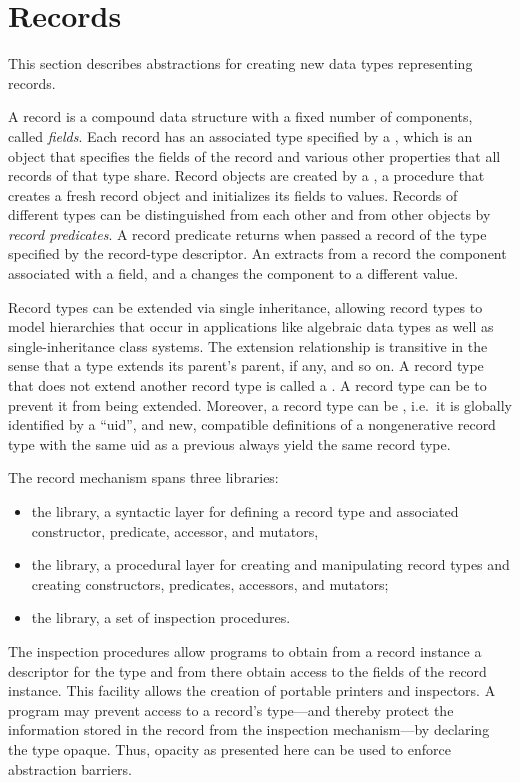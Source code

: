 \chapter{Records}
\label{recordschapter}
This section describes abstractions for creating new data types
representing records.

A record is a compound data structure with a fixed number of
components, called \textit{fields}.  Each record has
an associated type specified by a ,
which is an object that specifies the fields of the record and various
other properties that all records of that type share.  Record objects
are created by a , a procedure that
creates a fresh record object and initializes its fields to values.
Records of different types can be distinguished from each other and
from other objects by \textit{record predicates}. A record predicate
returns \schtrue{} when passed a record of the type specified by the
record-type descriptor.  An  extracts from a record
the component associated with a field, and a 
changes the component to a different value.

Record types can be extended via single inheritance, allowing record
types to model hierarchies that occur in applications like algebraic
data types as well as single-inheritance class systems.  The extension
relationship is transitive in the sense that a type extends its
parent's parent, if any, and so on.  A record type that does not
extend another record type is called a .  A
record type can be  to prevent it from being
extended.  Moreover, a record type can be ,
i.e.\ it is globally identified by a ``uid'', and new, compatible
definitions of a nongenerative record type with the same uid as a
previous always yield the same record type.

The record mechanism spans three libraries:

\begin{itemize}
\item the  library,
  a syntactic layer for defining a record type and
  associated constructor, predicate, accessor, and mutators,
\item the  library,
  a procedural layer for creating and manipulating record types and creating
  constructors, predicates, accessors, and mutators;
\item the  library,
  a set of inspection procedures.
\end{itemize}
% 
The inspection procedures allow programs to obtain from a record
instance a descriptor for the type and from there obtain access to the
fields of the record instance. This facility allows the creation of
portable printers and inspectors.  A program may prevent access to a
record's type---and thereby protect the information stored in the
record from the inspection mechanism---by declaring the type opaque.
Thus, opacity as presented here can be used to enforce abstraction
barriers.

